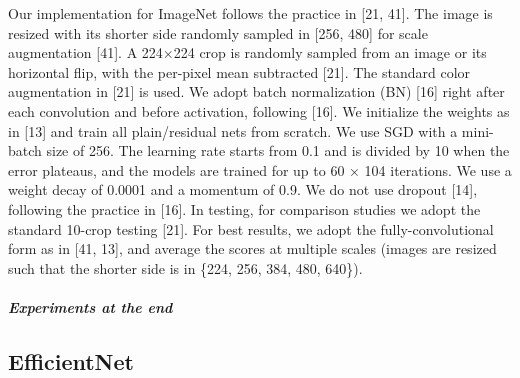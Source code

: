 \documentclass[
]{krantz}
\begin{document}
Our implementation for ImageNet follows the practice in {[}21, 41{]}. The image is resized with its shorter side randomly sampled in {[}256, 480{]} for scale augmentation {[}41{]}. A 224×224 crop is randomly sampled from an image or its horizontal flip, with the per-pixel mean subtracted {[}21{]}. The standard color augmentation in {[}21{]} is used. We adopt batch normalization (BN) {[}16{]} right after each convolution and before activation, following {[}16{]}. We initialize the weights as in {[}13{]} and train all plain/residual nets from scratch. We use SGD with a mini-batch size of 256. The learning rate starts from 0.1 and is divided by 10 when the error plateaus, and the models are trained for up to 60 × 104 iterations. We use a weight decay of 0.0001 and a momentum of 0.9. We do not use dropout {[}14{]}, following the practice in {[}16{]}.
In testing, for comparison studies we adopt the standard 10-crop testing {[}21{]}. For best results, we adopt the fully-convolutional form as in {[}41, 13{]}, and average the scores at multiple scales (images are resized such that the shorter side is in \{224, 256, 384, 480, 640\}).

\hypertarget{experiments-at-the-end}{%
\subparagraph{Experiments at the end}\label{experiments-at-the-end}}

\hypertarget{efficientnet}{%
\subsection{EfficientNet}\label{efficientnet}}
\end{document}
